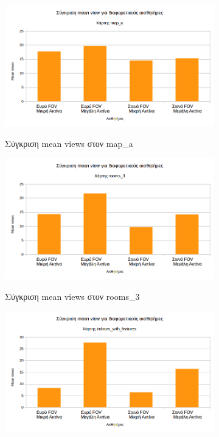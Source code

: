 \begin{figure}[H]\ContinuedFloat
    \captionsetup{justification=centering}
    \begin{subfigure}[b]{0.5\textwidth}
         \centering
         \includegraphics[width=\textwidth]{./images/chapter6/map_a_mean_views_compare.png}
         \label{fig:map_a_mean_views_compare}
         \caption{Σύγκριση mean views στον map\_a}
     \end{subfigure}%
     \begin{subfigure}[b]{0.5\textwidth}
         \centering
         \includegraphics[width=\textwidth]{./images/chapter6/rooms_3_mean_views_compare.png}
         \label{fig:rooms_3_mean_views_compare}
         \caption{Σύγκριση mean views στον rooms\_3}
     \end{subfigure}
     \begin{subfigure}[b]{0.5\textwidth}
         \centering
         \includegraphics[width=\textwidth]{./images/chapter6/indoors_with_features_mean_views_compare.png}

\end{subfigure}
\end{figure}
